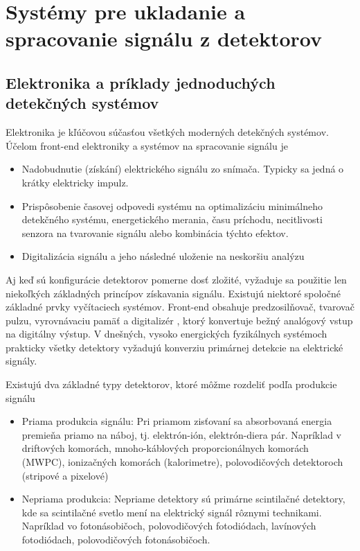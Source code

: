 \documentclass[../../main.tex]{subfiles}
\begin{document}
\chapter{Systémy pre ukladanie a spracovanie signálu z detektorov}

\section{Elektronika a príklady jednoduchých detekčných systémov}
Elektronika je kľúčovou súčasťou všetkých moderných detekčných systémov. Účelom front-end elektroniky a systémov na spracovanie signálu je
\begin{itemize}
\item Nadobudnutie (získání) elektrického signálu zo snímača. Typicky sa jedná o krátky elektricky impulz.
\item Prispôsobenie časovej odpovedi systému na optimalizáciu minimálneho detekčného systému, energetického merania, času príchodu, necitlivosti senzora na tvarovanie signálu alebo kombinácia týchto efektov.
\item Digitalizácia signálu a jeho následné uloženie na neskoršiu analýzu
\end{itemize}
Aj keď sú konfigurácie detektorov pomerne dosť zložité, vyžaduje sa použitie len niekoľkých základných princípov získavania signálu. Existujú niektoré spoločné základné prvky vyčítaciech systémov. Front-end obsahuje predzosilňovač, tvarovač pulzu, vyrovnávaciu pamäť a digitalizér , ktorý konvertuje bežný analógový vstup na digitálny výstup. V dnešných, vysoko energických fyzikálnych systémoch prakticky všetky detektory vyžadujú konverziu primárnej detekcie na elektrické signály.

Existujú dva základné typy detektorov, ktoré môžme rozdeliť podľa produkcie signálu
\begin{itemize}
\item Priama produkcia signálu: Pri priamom zisťovaní sa absorbovaná energia premieňa priamo na náboj, tj. elektrón-ión, elektrón-diera pár.
Napríklad v driftových komorách, mnoho-káblových proporcionálnych komorách (MWPC), ionizačných komorách (kalorimetre), polovodičových detektoroch (stripové a pixelové)
\item Nepriama produkcia: Nepriame detektory sú primárne scintilačné detektory, kde sa scintilačné svetlo mení na elektrický signál rôznymi technikami. Napríklad vo fotonásobičoch, polovodičových fotodiódach, lavínových fotodiódach, polovodičových fotonásobičoch.
\end{itemize}
\end{document}
